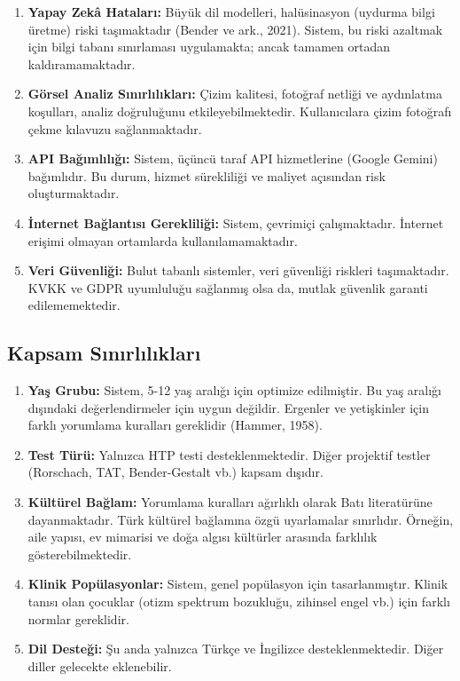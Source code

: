 \begin{enumerate}
  \item \textbf{Yapay Zekâ Hataları:} Büyük dil modelleri, halüsinasyon (uydurma bilgi üretme) riski taşımaktadır (Bender ve ark., 2021). Sistem, bu riski azaltmak için bilgi tabanı sınırlaması uygulamakta; ancak tamamen ortadan kaldıramamaktadır.

  \item \textbf{Görsel Analiz Sınırlılıkları:} Çizim kalitesi, fotoğraf netliği ve aydınlatma koşulları, analiz doğruluğunu etkileyebilmektedir. Kullanıcılara çizim fotoğrafı çekme kılavuzu sağlanmaktadır.

  \item \textbf{API Bağımlılığı:} Sistem, üçüncü taraf API hizmetlerine (Google Gemini) bağımlıdır. Bu durum, hizmet sürekliliği ve maliyet açısından risk oluşturmaktadır.

  \item \textbf{İnternet Bağlantısı Gerekliliği:} Sistem, çevrimiçi çalışmaktadır. İnternet erişimi olmayan ortamlarda kullanılamamaktadır.

  \item \textbf{Veri Güvenliği:} Bulut tabanlı sistemler, veri güvenliği riskleri taşımaktadır. KVKK ve GDPR uyumluluğu sağlanmış olsa da, mutlak güvenlik garanti edilememektedir.
\end{enumerate}

\subsection{Kapsam Sınırlılıkları}

\begin{enumerate}
  \item \textbf{Yaş Grubu:} Sistem, 5-12 yaş aralığı için optimize edilmiştir. Bu yaş aralığı dışındaki değerlendirmeler için uygun değildir. Ergenler ve yetişkinler için farklı yorumlama kuralları gereklidir (Hammer, 1958).

  \item \textbf{Test Türü:} Yalnızca HTP testi desteklenmektedir. Diğer projektif testler (Rorschach, TAT, Bender-Gestalt vb.) kapsam dışıdır.

  \item \textbf{Kültürel Bağlam:} Yorumlama kuralları ağırlıklı olarak Batı literatürüne dayanmaktadır. Türk kültürel bağlamına özgü uyarlamalar sınırlıdır. Örneğin, aile yapısı, ev mimarisi ve doğa algısı kültürler arasında farklılık gösterebilmektedir.

  \item \textbf{Klinik Popülasyonlar:} Sistem, genel popülasyon için tasarlanmıştır. Klinik tanısı olan çocuklar (otizm spektrum bozukluğu, zihinsel engel vb.) için farklı normlar gereklidir.

  \item \textbf{Dil Desteği:} Şu anda yalnızca Türkçe ve İngilizce desteklenmektedir. Diğer diller gelecekte eklenebilir.
\end{enumerate}

